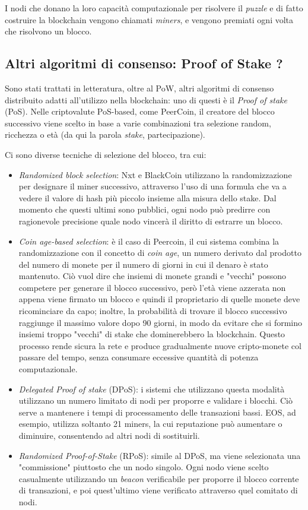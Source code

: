 I nodi che donano la loro capacità computazionale per risolvere il \textit{puzzle} e di fatto costruire la blockchain vengono chiamati \textit{miners}, e vengono premiati ogni volta che risolvono un blocco.


\subsection{Altri algoritmi di consenso: Proof of Stake ? }
\label{c:tec:bitcoin:pow}

Sono stati trattati in letteratura, oltre al PoW, altri algoritmi di consenso distribuito adatti all'utilizzo nella blockchain: uno di questi è il \textit{Proof of stake} (PoS)\cite{Li2005}. Nelle criptovalute PoS-based, come PeerCoin, il creatore del blocco successivo viene scelto in base a varie combinazioni tra selezione random, ricchezza o età (da qui la parola \textit{stake}, partecipazione).

Ci sono diverse tecniche di selezione del blocco, tra cui:

\begin{itemize}
    \item \textit{Randomized block selection}: Nxt e BlackCoin utilizzano la randomizzazione per designare il miner successivo, attraverso l'uso di una formula che va a vedere il valore di hash più piccolo insieme alla misura dello stake. Dal momento che questi ultimi sono pubblici, ogni nodo può predirre con ragionevole precisione quale nodo vincerà il diritto di estrarre un blocco.
    \item \textit{Coin age-based selection}: è il caso di Peercoin, il cui sistema combina la randomizzazione con il concetto di \textit{coin age}, un numero derivato dal prodotto del numero di monete per il numero di giorni in cui il denaro è stato mantenuto. Ciò vuol dire che insiemi di monete grandi e "vecchi" possono competere per generare il blocco successivo, però l'età viene azzerata non appena viene firmato un blocco e quindi il proprietario di quelle monete deve ricominciare da capo; inoltre, la probabilità di trovare il blocco successivo raggiunge il massimo valore dopo 90 giorni, in modo da evitare che si formino insiemi troppo "vecchi" di stake che dominerebbero la blockchain. Questo processo rende sicura la rete e produce gradualmente nuove cripto-monete col passare del tempo, senza consumare eccessive quantità di potenza computazionale. 
    \item \textit{Delegated Proof of stake} (DPoS): i sistemi che utilizzano questa modalità utilizzano un numero limitato di nodi per proporre e validare i blocchi. Ciò serve a mantenere i tempi di processamento delle transazioni bassi. EOS, ad esempio, utilizza soltanto 21 miners, la cui reputazione può aumentare o diminuire, consentendo ad altri nodi di sostituirli. 
    \item \textit{Randomized Proof-of-Stake} (RPoS): simile al DPoS, ma viene selezionata una "commissione" piuttosto che un nodo singolo. Ogni nodo viene scelto casualmente utilizzando un \textit{beacon} verificabile per proporre il blocco corrente di transazioni, e poi quest'ultimo viene verificato attraverso quel comitato di nodi.
\end{itemize}
